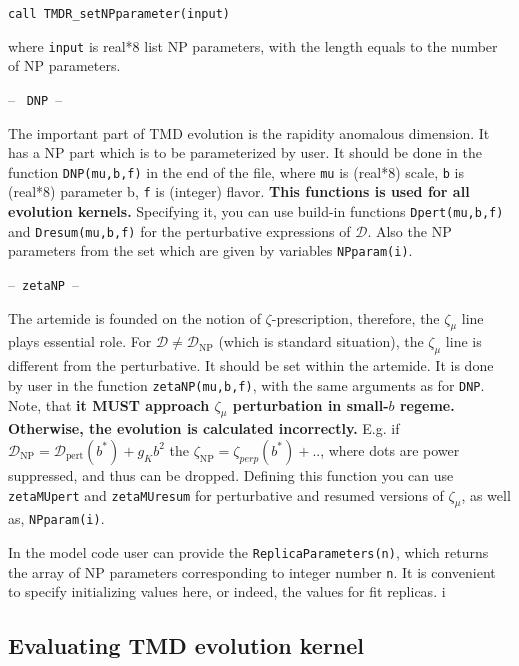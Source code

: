 \documentclass[prd,nofootinbib,eqsecnum,final]{revtex4}
\renewcommand{\(}{\left(}
\renewcommand{\)}{\right)}
\renewcommand{\[}{\left[}
\renewcommand{\]}{\right]}
\begin{document}
\texttt{call TMDR{\_}setNPparameter(input)}

where \texttt{input} is real*8 list NP parameters, with the length equals to the number of NP parameters.

\begin{center}
-- ~\texttt{DNP}~--
\end{center}

The important part of TMD evolution is the rapidity anomalous dimension. It has a NP part which is to be parameterized by user. It should be done in the function \texttt{DNP(mu,b,f)} in the end of the file, where \texttt{mu} is (real*8) scale, \texttt{b} is (real*8) parameter b, \texttt{f} is (integer) flavor. \textbf{This functions is used for all evolution kernels.} Specifying it, you can use build-in functions \texttt{Dpert(mu,b,f)} and \texttt{Dresum(mu,b,f)} for the perturbative expressions of $\mathcal{D}$. Also the NP parameters from the set which are given by variables \texttt{NPparam(i)}.

\begin{center}
--~\texttt{zetaNP}~--
\end{center}

The artemide is founded on the notion of $\zeta$-prescription, therefore, the $\zeta_\mu$ line plays essential role. For $\mathcal{D}\neq \mathcal{D}_{\text{NP}}$ (which is standard situation), the $\zeta_\mu$ line is different from the perturbative. It should be set within the artemide. It is done by user in the function \texttt{zetaNP(mu,b,f)}, with the same arguments as for \texttt{DNP}. Note, that \textbf{it MUST approach $\zeta_\mu$ perturbation in small-$b$ regeme. Otherwise, the evolution is calculated incorrectly.} E.g. if $\mathcal{D}_{\text{NP}}=\mathcal{D}_{\text{pert}}(b^*)+g_Kb^2$ the $\zeta_{\text{NP}}=\zeta_{perp}(b^*)+..$, where dots are power suppressed, and thus can be dropped. Defining this function you can use \texttt{zetaMUpert} and \texttt{zetaMUresum} for perturbative and resumed versions of $\zeta_\mu$, as well as, \texttt{NPparam(i)}.

In the model code user can provide the \texttt{ReplicaParameters(n)}, which returns the array of NP parameters corresponding to integer number \texttt{n}. It is convenient to specify initializing values here, or indeed, the values for fit replicas. i


\subsection{Evaluating TMD evolution kernel}
\label{TMDR:R}
\end{document}
